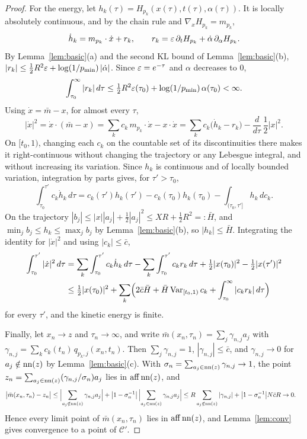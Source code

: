 \documentclass{article} %
\newcommand{\iclrstart}{\begin{aligned}&}\newcommand{\iclrend}{\end{aligned}}
\newcommand{\iclrallow}{\allowbreak}
\newcommand{\iclrstart}{}\newcommand{\iclrend}{}\newcommand{\iclrallow}{}
\theoremstyle{plain}
\theoremstyle{definition}
\theoremstyle{remark}
\begin{document}
\begin{proof}
For the energy, let $h_k(\tau)=H_{p_k}(x(\tau),t(\tau),\alpha(\tau))$. It is locally absolutely
continuous, and by the chain rule and $\nabla_xH_{p_k}=m_{p_k}$,
\[
\dot h_k=m_{p_k}\cdot\dot x+r_k,\qquad
r_k=\varepsilon\,\partial_tH_{p_k}+\dot\alpha\,\partial_\alpha H_{p_k}.
\]
By Lemma~\ref{lem:basic}(a) and the second KL bound of Lemma~\ref{lem:basic}(b),
$|r_k|\le\tfrac12R^2\varepsilon+\log(1/p_{\min})\,|\dot\alpha|$. Since $\varepsilon=e^{-\tau}$ and $\alpha$
decreases to $0$,
\[
\int_{\tau_0}^\infty|r_k|\,d\tau\le\tfrac12R^2\varepsilon(\tau_0)+\log(1/p_{\min})\,\alpha(\tau_0)<\infty .
\]
Using $\dot x=\bar m-x$, for almost every $\tau$,
\[
|\dot x|^2=\dot x\cdot(\bar m-x)=\sum_kc_k\,m_{p_k}\cdot\dot x-x\cdot\dot x
=\sum_kc_k\bigl(\dot h_k-r_k\bigr)-\frac{d}{d\tau}\,\frac12|x|^2 .
\]
On $[t_0,1)$, changing each $c_k$ on the countable set of its discontinuities there makes it
right-continuous without changing the trajectory or any Lebesgue integral, and without increasing
its variation. Since $h_k$ is continuous and of locally bounded variation, integration by parts
gives, for $\tau'>\tau_0$,
\[
\int_{\tau_0}^{\tau'}c_k\dot h_k\,d\tau=c_k(\tau')h_k(\tau')-c_k(\tau_0)h_k(\tau_0)
-\int_{(\tau_0,\tau']}h_k\,dc_k .
\]
On the trajectory $|b_j|\le|x||a_j|+\tfrac12|a_j|^2\le XR+\tfrac12R^2=:\bar H$, and
$\min_jb_j\le h_k\le\max_jb_j$ by Lemma~\ref{lem:basic}(b), so $|h_k|\le\bar H$. Integrating the
identity for $|\dot x|^2$ and using $|c_k|\le\bar c$,
\begin{align*}
\int_{\tau_0}^{\tau'}|\dot x|^2\,d\tau
&=\sum_k\int_{\tau_0}^{\tau'}c_k\dot h_k\,d\tau-\sum_k\int_{\tau_0}^{\tau'}c_kr_k\,d\tau
+\tfrac12|x(\tau_0)|^2-\tfrac12|x(\tau')|^2\\
&\le\tfrac12|x(\tau_0)|^2+\sum_k\Bigl(2\bar c\bar H+\bar H\operatorname{Var}_{[t_0,1)}c_k
+\int_{\tau_0}^\infty|c_kr_k|\,d\tau\Bigr)
\end{align*}
for every $\tau'$, and the kinetic energy is finite.

Finally, let $x_n\to z$ and $\tau_n\to\infty$, and write $\bar m(x_n,\tau_n)=\sum_j\gamma_{n,j}a_j$
with $\gamma_{n,j}=\sum_kc_k(t_n)\,q_{p_k,j}(x_n,t_n)$. Then $\sum_j\gamma_{n,j}=1$,
$|\gamma_{n,j}|\le\bar c$, and $\gamma_{n,j}\to0$ for $a_j\notin\operatorname{nn}(z)$ by Lemma~\ref{lem:basic}(c).
With $\sigma_n=\sum_{a_j\in\operatorname{nn}(z)}\gamma_{n,j}\to1$, the point
$z_n=\sum_{a_j\in\operatorname{nn}(z)}(\gamma_{n,j}/\sigma_n)a_j$ lies in $\operatorname{aff}\operatorname{nn}(z)$, and
\[
\iclrstart\bigl|\bar m(x_n,\tau_n)-z_n\bigr|
\le\Bigl|\sum_{a_j\notin\nn(z)}\gamma_{n,j}a_j\Bigr|
+\bigl|1-\sigma_n^{-1}\bigr|\,\Bigl|\sum_{a_j\in\nn(z)}\gamma_{n,j}a_j\Bigr|
\iclrbrq\le R\sum_{a_j\notin\nn(z)}|\gamma_{n,j}|+\bigl|1-\sigma_n^{-1}\bigr|N\bar cR\to0 .\iclrend
\]
Hence every limit point of $\bar m(x_n,\tau_n)$ lies in $\operatorname{aff}\operatorname{nn}(z)$, and
Lemma~\ref{lem:conv} gives convergence to a point of $\mathcal C'$.
\end{proof}
\end{document}
